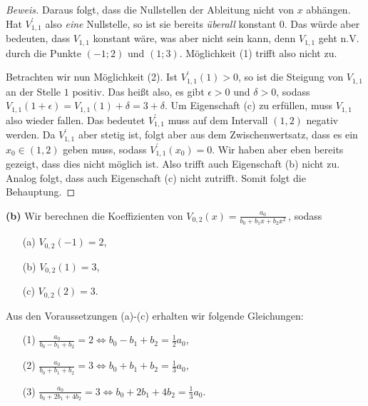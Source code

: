 \documentclass[a4paper]{article}
\begin{document}
\begin{proof}[Beweis]
    Daraus folgt, dass die Nullstellen der Ableitung nicht von $x$ abhängen. Hat $V_{1,1}^\prime$ also \textit{eine} 
    Nullstelle, so ist sie bereits \textit{überall} konstant $0$. Das würde aber bedeuten, dass $V_{1,1}$ konstant wäre, was aber
    nicht sein kann, denn $V_{1,1}$ geht n.V. durch die Punkte $(-1; 2)$ und $(1; 3)$. Möglichkeit (1) trifft also nicht zu.\par
    Betrachten wir nun Möglichkeit (2). Ist $V_{1,1}^\prime(1) > 0$, so ist die Steigung von $V_{1,1}$ an der Stelle $1$ positiv.
    Das heißt also, es gibt $\epsilon>0$ und $\delta>0$, sodass $V_{1,1}(1+\epsilon) = V_{1,1}(1) + \delta = 3 + \delta$.
    Um Eigenschaft (c) zu erfüllen, muss $V_{1,1}$ also wieder fallen. Das bedeutet $V_{1,1}^\prime$ muss auf dem Intervall 
    $(1,2)$ negativ werden. Da $V_{1,1}^\prime$ aber stetig ist, folgt aber aus dem Zwischenwertsatz, dass es ein $x_0\in (1,2)$ geben muss, sodass 
    $V_{1,1}^\prime(x_0) = 0$. Wir haben aber eben bereits gezeigt, dass dies nicht möglich ist. Also trifft auch Eigenschaft (b) nicht zu.
    Analog folgt, dass auch Eigenschaft (c) nicht zutrifft. Somit folgt die Behauptung.
\end{proof}

\textbf{(b)} Wir berechnen die Koeffizienten von $V_{0,2}(x) = \frac{a_0}{b_0+b_1x+b_2x^2}$\,, sodass 
    \begin{itemize}
        \item[(a)] $V_{0,2}(-1) = 2$, 
        \item[(b)] $V_{0,2}(1) = 3$,
        \item[(c)] $V_{0,2}(2) = 3$. 
    \end{itemize}

    Aus den Voraussetzungen (a)-(c) erhalten wir folgende Gleichungen:
    \begin{itemize}
        \item[(1)] $\frac{a_0}{b_0-b_1+b_2} = 2  \Longleftrightarrow  b_0 - b_1 + b_2 = \frac{1}{2}a_0$,
        \item[(2)] $\frac{a_0}{b_0+b_1+b_2} = 3  \Longleftrightarrow  b_0 + b_1 + b_2 = \frac{1}{3}a_0$,
        \item[(3)] $\frac{a_0}{b_0+2b_1+4b_2} = 3 \Longleftrightarrow b_0 + 2b_1 + 4b_2 = \frac{1}{3}a_0$.  
    \end{itemize}
\end{document}
